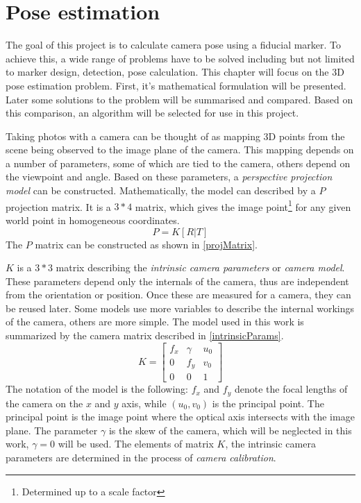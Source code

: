 \chapter{Pose estimation}\label{sect:pose}

The goal of this project is to calculate camera pose using a fiducial marker.
To achieve this, a wide range of problems have to be solved including but not limited to marker design, detection, pose calculation.
This chapter will focus on the 3D pose estimation problem.
First, it's mathematical formulation will be presented.
Later some solutions to the problem will be summarised and compared.
Based on this comparison, an algorithm will be selected for use in this project.

Taking photos with a camera can be thought of as mapping 3D points from the scene being observed to the image plane of the camera.
This mapping depends on a number of parameters, some of which are tied to the camera, others depend on the viewpoint and angle.
Based on these parameters, a \textit{perspective projection model} can be constructed.
Mathematically, the model can described by a $P$ projection matrix.
It is a $3*4$ matrix, which gives the image point\footnote{Determined up to a scale factor} for any given world point in homogeneous coordinates.
\begin{equation}
	P = K [R|T]
	\label{eq:projMatrix}
\end{equation}
The $P$ matrix can be constructed as shown in \eqref{projMatrix}.

$K$ is a $3*3$ matrix describing the \textit{intrinsic camera parameters} or \textit{camera model}.
These parameters depend only the internals of the camera, thus are independent from the orientation or position.
Once these are measured for a camera, they can be reused later.
Some models use more variables to describe the internal workings of the camera, others are more simple.
The model used in this work is summarized by the camera matrix described in \eqref{intrinsicParams}.
\begin{equation}
	K =
	\begin{bmatrix}
		f_x & \gamma & u_0 \\
		0   & f_y    & v_0 \\
		0   & 0      & 1
	\end{bmatrix}
	\label{eq:intrinsicParams}
\end{equation}
The notation of the model is the following: $f_x$ and $f_y$ denote the focal lengths of the camera on the $x$ and $y$ axis, while $(u_0,v_0)$ is the principal point.
The principal point is the image point where the optical axis intersects with the image plane.
The parameter $\gamma$ is the skew of the camera, which will be neglected in this work, $\gamma = 0$ will be used.
The elements of matrix $K$, the intrinsic camera parameters are determined in the process of \textit{camera calibration}.

